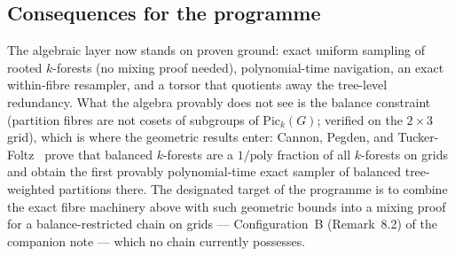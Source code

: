\documentclass[11pt]{article}
\begin{document}
\subsection{Consequences for the programme}

The algebraic layer now stands on proven ground: exact uniform sampling of
rooted $k$-forests (no mixing proof needed), polynomial-time navigation, an
exact within-fibre resampler, and a torsor that quotients away the tree-level
redundancy. What the algebra provably does not see is the balance constraint
(partition fibres are not cosets of subgroups of $\mathrm{Pic}_k(G)$; verified
on the $2 \times 3$ grid), which is where the geometric results enter: Cannon,
Pegden, and Tucker-Foltz~\cite{cannon2024balanced} prove that balanced
$k$-forests are a $1/\mathrm{poly}$ fraction of all $k$-forests on grids and
obtain the first provably polynomial-time exact sampler of balanced
tree-weighted partitions there. The designated target of the programme is to
combine the exact fibre machinery above with such geometric bounds into a
mixing proof for a balance-restricted chain on grids --- Configuration~B
(Remark~8.2) of the companion note --- which no chain currently possesses.
\end{document}
